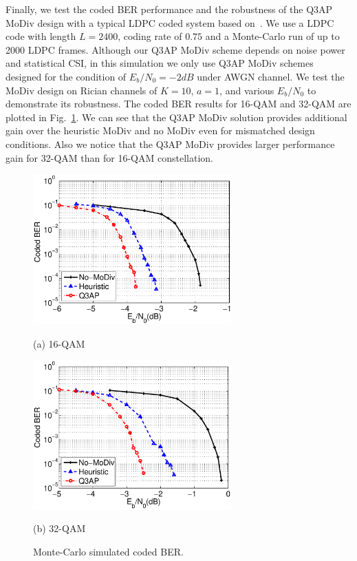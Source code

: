 \documentclass[journal,draftcls,onecolumn,12pt,twoside]{IEEEtran}
\begin{document}
Finally, we test the coded BER performance and the robustness of the Q3AP MoDiv
design with a typical LDPC coded system based on~\cite{hochwald2003achieving}.
We use a LDPC code with length $L=2400$, coding rate of $0.75$ and a
Monte-Carlo run of up to 2000 LDPC frames. Although our Q3AP MoDiv scheme
depends on noise power and statistical CSI, in this simulation we only use Q3AP
MoDiv schemes designed for the condition of $E_b/N_0=-2dB$ under AWGN channel.
We test the MoDiv design on Rician channels of $K=10$, $a=1$, and various
$E_b/N_0$ to demonstrate its robustness. The coded BER results for 16-QAM and
32-QAM are plotted in Fig.~\ref{fig:coded_BER}. We can see that the Q3AP MoDiv
solution provides additional gain over the heuristic MoDiv and no MoDiv even for
mismatched design conditions. Also we notice that the Q3AP MoDiv provides larger
performance gain for 32-QAM than for 16-QAM constellation.

\begin{figure}[!t]
    \begin{minipage}[b]{0.49\linewidth}
      \centering
      \centerline{\includegraphics[width=3.0in]{./figs/coded_BER16QAM.eps}}
      \centerline{(a) 16-QAM}\medskip
    \end{minipage}
    \hfill
    \begin{minipage}[b]{0.49\linewidth}
      \centering
      \centerline{\includegraphics[width=3.0in]{./figs/coded_BER32QAM.eps}}
      \centerline{(b) 32-QAM}\medskip
    \end{minipage}
    \caption{Monte-Carlo simulated coded BER.}
    \label{fig:coded_BER}
\end{figure}
\end{document}
